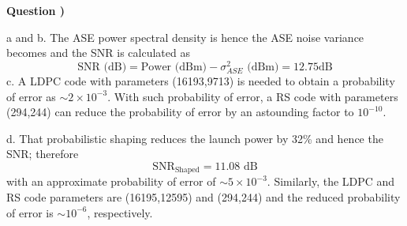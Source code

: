 \documentclass[10pt,letterpaper]{article}
\newcounter{QuestionNumber}
\newcommand{\Q}{
\textbf{Question \theQuestionNumber)}
\stepcounter{QuestionNumber}
}
\begin{document}
\Q

a and b. The ASE power spectral density is
hence the ASE noise variance becomes
and the SNR is calculated as
$$
\text{SNR (dB)}=\text{Power (dBm)}-\sigma^2_{ASE}\text{ (dBm)}=12.75 \text{dB}
$$
c. A LDPC code with parameters (16193,9713) is needed to obtain a probability of error as $\sim 2\times 10^{-3}$. With such probability of error, a RS code with parameters (294,244) can reduce the probability of error by an astounding factor to $10^{-10}$.

d. That probabilistic shaping reduces the launch power by 32\% and hence the SNR; therefore
$$
\text{SNR}_{\text{Shaped}}=11.08\text{ dB}
$$
with an approximate probability of error of $\sim 5\times 10^{-3}$. Similarly, the LDPC and RS code parameters are (16195,12595) and (294,244) and the reduced probability of error is $\sim 10^{-6}$, respectively.
\end{document}

